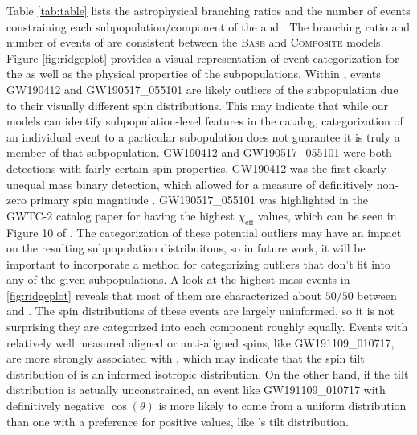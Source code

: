 Table \ref{tab:table} lists the astrophysical branching ratios and the number of events constraining each subpopulation/component of the \base{} and \comp{}. The branching ratio and number of events of \first{} are consistent between the \textsc{Base} and \textsc{Composite} models. Figure \ref{fig:ridgeplot} provides a visual representation of event categorization for the \comp{} as well as the physical properties of the subpopulations. Within \contA{}, events GW190412 and GW190517\_055101 are likely outliers of the subpopulation due to their visually different spin distributions. This may indicate that while our models can identify subpopulation-level features in the catalog, categorization of an individual event to a particular subopulation does not guarantee it is truly a member of that subpopulation. GW190412 and GW190517\_055101 were both detections with fairly certain spin properties. GW190412 was the first clearly unequal mass binary detection, which allowed for a measure of definitively non-zero primary spin magntiude \citep{10.3847/2041-8213/aba8ef, 2010.14527}. GW190517\_055101 was highlighted in the GWTC-2 catalog paper \citet{2010.14527} for having the highest $\chi_\text{eff}$ values, which can be seen in Figure 10 of \citet{2010.14527}. The categorization of these potential outliers may have an impact on the resulting subpopulation distribuitons, so in future work, it will be important to incorporate a method for categorizing outliers that don't fit into any of the given subpopulations. 
A look at the highest mass events in \ref{fig:ridgeplot} reveals that most of them are characterized about $50/50$ between \contA{} and \contB{}. The spin distributions of these events are largely uninformed, so it is not surprising they are categorized into each component roughly equally. Events with relatively well measured aligned or anti-aligned spins, like GW191109\_010717, are more strongly associated with \contB{}, which may indicate that the spin tilt distribution of \contB{} is an informed isotropic distribution. On the other hand, if the tilt distribution is actually unconstrained, an event like GW191109\_010717 with definitively negative $\cos(\theta)$ is more likely to come from a uniform distribution than one with a preference for positive values, like \contA{}'s tilt distribution. 


